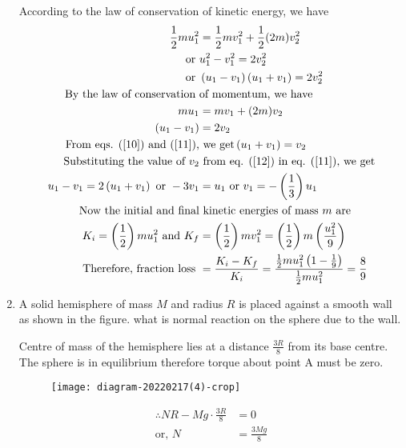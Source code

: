 \begin{enumerate}
\begin{answer}
	According to the law of conservation of kinetic energy, we have
	\begin{align}
 \frac{1}{2} m u_{1}^{2}&=\frac{1}{2} m v_{1}^{2}+\frac{1}{2}(2 m) v_{2}^{2}\notag \\ \text { or } & u_{1}^{2}-v_{1}^{2}=2 v_{2}^{2} \notag\\ \text { or } & \left(u_{1}-v_{1}\right)\left(u_{1}+v_{1}\right)=2 v_{2}^{2}\label{10}\\
\text{ By the law of conservation }&\text{of momentum, we have}\notag\\
 m u_{1}&=m v_{1}+(2 m) v_{2} \notag\\
 \left(u_{1}-v_{1}\right)&=2 v_{2}\label{11}\\
\text{ From eqs. (\ref{10}) and (\ref{11}),}&\text{ we get} \left(u_{1}+v_{1}\right)=v_{2}\label{12}\\
\text{ Substituting the value of $v_{2}$}&\text{ from eq. (\ref{12}) in eq. (\ref{11}), we get}\notag\\
u_{1}-v_{1}=2\left(u_{1}+v_{1}\right) \text { or }-3 v_{1}&=u_{1} \text { or } v_{1}=-\left(\frac{1}{3}\right) u_{1}\label{13}\\
\text{Now the initial and final}&\text{ kinetic energies of mass $m$ are}
\\
K_{i}=\left(\frac{1}{2}\right) m u_{1}^{2} \text { and } K_{f}&=\left(\frac{1}{2}\right) m v_{1}^{2}=\left(\frac{1}{2}\right) m\left(\frac{u_{1}^{2}}{9}\right)\notag\\
\text{Therefore, fraction loss }&=\frac{K_{i}-K_{f}}{K_{i}}=\frac{\frac{1}{2} m u_{1}^{2}\left(1-\frac{1}{9}\right)}{\frac{1}{2} m u_{1}^{2}}=\frac{8}{9}\notag
	\end{align}
\end{answer}
\item A solid hemisphere of mass $M$ and radius $R$ is placed against a smooth wall as shown in the figure. what is normal reaction on the sphere due to the wall.
\begin{answer}
	Centre of mass of the hemisphere lies at a distance $\frac{3 R}{8}$ from
	its base centre. The sphere is in equilibrium therefore torque about point A must be zero.
	\begin{figure}[H]
		\centering
		\texttt{[image: diagram-20220217(4)-crop]}
	\end{figure}
	\begin{align*}
	\therefore N R-M g \cdot \frac{3 R}{8}&=0\\
	\text{or, }N&=\frac{3 M g}{8}
	\end{align*}

\end{answer}
\end{enumerate}
